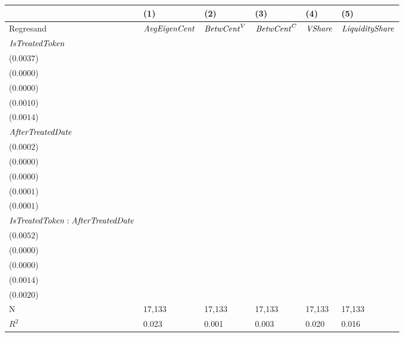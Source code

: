 \begin{tabular}{llllll}
\toprule
{} &                                      (1) &                                      (2) &                                      (3) &                                      (4) &                                      (5) \\
\midrule
Regresand                                     &                     ${\it AvgEigenCent}$ &                       ${\it BetwCent}^V$ &                       ${\it BetwCent}^C$ &                           ${\it VShare}$ &                   ${\it LiquidityShare}$ \\
${\it IsTreatedToken}$                        &  \makecell{$0.0406^{***}$ \\ ($0.0037$)} &     \makecell{$0.0000^{}$ \\ ($0.0000$)} &     \makecell{$0.0000^{}$ \\ ($0.0000$)} &  \makecell{$0.0092^{***}$ \\ ($0.0010$)} &  \makecell{$0.0063^{***}$ \\ ($0.0014$)} \\
${\it AfterTreatedDate}$                      &  \makecell{$0.0028^{***}$ \\ ($0.0002$)} &  \makecell{$0.0000^{***}$ \\ ($0.0000$)} &  \makecell{$0.0000^{***}$ \\ ($0.0000$)} &  \makecell{$0.0007^{***}$ \\ ($0.0001$)} &  \makecell{$0.0012^{***}$ \\ ($0.0001$)} \\
${\it IsTreatedToken}:{\it AfterTreatedDate}$ &    \makecell{$-0.0052^{}$ \\ ($0.0052$)} &    \makecell{$-0.0000^{}$ \\ ($0.0000$)} &    \makecell{$-0.0000^{}$ \\ ($0.0000$)} &    \makecell{$-0.0005^{}$ \\ ($0.0014$)} &    \makecell{$-0.0001^{}$ \\ ($0.0020$)} \\
\midrule N                                    &                                   17,133 &                                   17,133 &                                   17,133 &                                   17,133 &                                   17,133 \\
$R^2$                                         &                                    0.023 &                                    0.001 &                                    0.003 &                                    0.020 &                                    0.016 \\
\bottomrule
\end{tabular}
